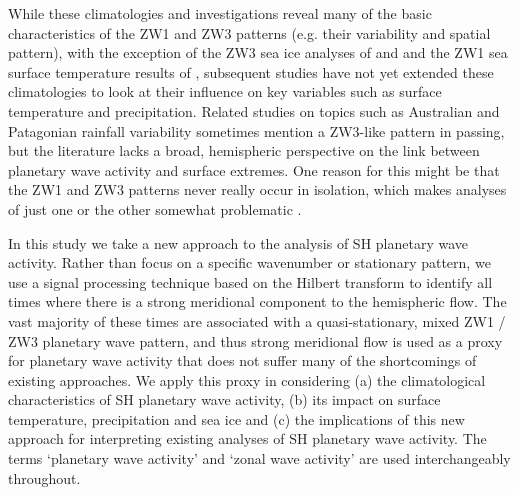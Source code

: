 While these climatologies and investigations reveal many of the basic characteristics of the ZW1 and ZW3 patterns (e.g. their variability and spatial pattern), with the exception of the ZW3 sea ice analyses of \citet{Raphael2007} and \citet{Yuan2008} and the ZW1 sea surface temperature results of \citet{Hobbs2007}, subsequent studies have not yet extended these climatologies to look at their influence on key variables such as surface temperature and precipitation. Related studies on topics such as Australian \citep{Frederiksen2014} and Patagonian \citep{Garreaud2013} rainfall variability sometimes mention a ZW3-like pattern in passing, but the literature lacks a broad, hemispheric perspective on the link between planetary wave activity and surface extremes. One reason for this might be that the ZW1 and ZW3 patterns never really occur in isolation, which makes analyses of just one or the other somewhat problematic \citep{Hobbs2010}.

In this study we take a new approach to the analysis of SH planetary wave activity. Rather than focus on a specific wavenumber or stationary pattern, we use a signal processing technique based on the Hilbert transform to identify all times where there is a strong meridional component to the hemispheric flow. The vast majority of these times are associated with a quasi-stationary, mixed ZW1 / ZW3 planetary wave pattern, and thus strong meridional flow is used as a proxy for planetary wave activity that does not suffer many of the shortcomings of existing approaches. We apply this proxy in considering (a) the climatological characteristics of SH planetary wave activity, (b) its impact on surface temperature, precipitation and sea ice and (c) the implications of this new approach for interpreting existing analyses of SH planetary wave activity. The terms `planetary wave activity' and `zonal wave activity' are used interchangeably throughout.
